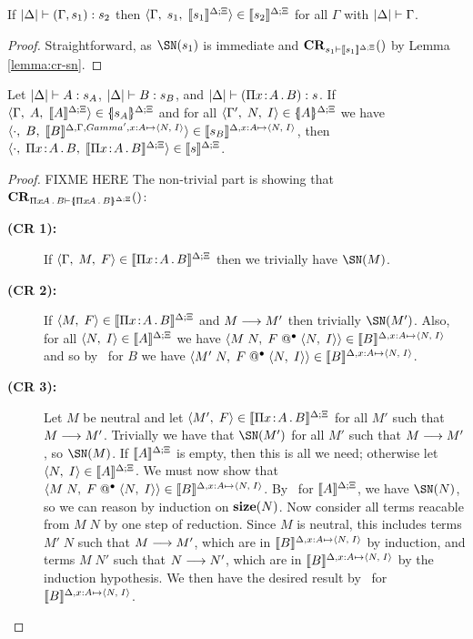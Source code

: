 \documentclass[conference]{IEEEtran}
\begin{document}
\begin{lemma}
  \label{lemma:sorts}
  If $\typejd{(\Gamma,s_1)}{s_2}$ then
  $\triple{\Gamma}{s_1}{\interp{s_1}}\in\interp{s_2}$ for all $\Gamma$
  with $\validjd{\Gamma}$.
\end{lemma}

\begin{proof}
  Straightforward, as $\SN(s_1)$ is immediate and
  $\CR{s_1}{\interp{s_1}}$ by Lemma \ref{lemma:cr-sn}.
\end{proof}


\begin{lemma}
  \label{lemma:pi}
  Let $\typejd{A}{s_A}$, $\typejd{B}{s_B}$, and
  $\typejd{(\pitype{x}{A}{B})}{s}$.  If
  $\triple{\Gamma}{A}{\interp{A}}\in\interpd{s_A}$ and for all
  $\triple{\Gamma'}{N}{I}\in\interpd{A}$ we have
  $\triple{\cdot}{B}{\interp[\Delta,\Gamma,Gamma',x:A\mapsto\pair{N}{I}]{B}}\in\interp[\Delta,x:A\mapsto\pair{N}{I}]{s_B}$,
  then
  $\triple{\cdot}{\pitype{x}{A}{B}}{\interp{\pitype{x}{A}{B}}}\in\interp{s}$.
\end{lemma}

\begin{proof}
  FIXME HERE
  The non-trivial part is showing that
  $\CR{\pitype{x}{A}{B}}{\interpd{\pitype{x}{A}{B}}}$:
  \begin{description}
  \item[\textbf{(CR 1):}] \hspace*{10pt} If
    $\triple{\Gamma}{M}{F}\in\interp{\pitype{x}{A}{B}}$ then we trivially have
    $\SN(M)$.
  \item[\textbf{(CR 2):}] \hspace*{10pt} If
    $\pair{M}{F}\in\interp{\pitype{x}{A}{B}}$ and $M\rrto M'$ then
    trivially $\SN(M')$. Also, for all $\pair{N}{I}\in\interp{A}$
    we have $\pair{M\;N}{\appstar{F}{\pair{N}{I}}}\in
    \interp[\Delta,x:A\mapsto\pair{N}{I}]{B}$ and so by \CRtwo\ for
    $B$ we have $\pair{M'\;N}{\appstar{F}{\pair{N}{I}}}\in
    \interp[\Delta,x:A\mapsto\pair{N}{I}]{B}$.
  \item[\textbf{(CR 3):}] \hspace*{10pt} Let $M$ be neutral and let
    $\pair{M'}{F}\in\interp{\pitype{x}{A}{B}}$ for all $M'$ such that
    $M\rrto M'$. Trivially we have that $\SN(M')$ for all $M'$ such
    that $M\rrto M'$, so $\SN(M)$. If $\interp{A}$ is empty, then this
    is all we need; otherwise let $\pair{N}{I}\in\interp{A}$. We must
    now show that $\pair{M\;N}{\appstar{F}{\pair{N}{I}}}\in
    \interp[\Delta,x:A\mapsto\pair{N}{I}]{B}$. By \CRone\ for
    $\interp{A}$, we have $\SN(N)$, so we can reason by induction on
    $\size{N}$. Now consider all terms reacable from $M\;N$ by one
    step of reduction. Since $M$ is neutral, this includes terms
    $M'\;N$ such that $M\rrto M'$, which are in
    $\interp[\Delta,x:A\mapsto\pair{N}{I}]{B}$ by induction, and terms
    $M\;N'$ such that $N\rrto N'$, which are in
    $\interp[\Delta,x:A\mapsto\pair{N}{I}]{B}$ by the induction
    hypothesis.  We then have the desired result by \CRthree\ for
    $\interp[\Delta,x:A\mapsto\pair{N}{I}]{B}$.
  \end{description}
\end{proof}
\end{document}
